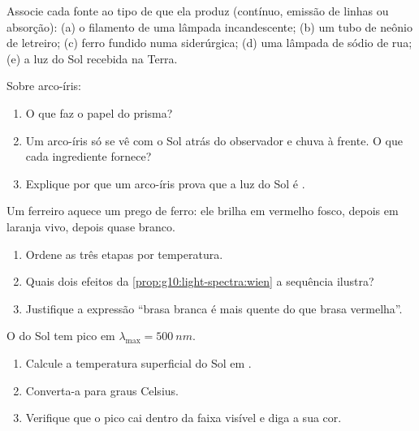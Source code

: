 \begin{exercise}[$\star$]\label{exo:g10:light-spectra:3}
Associe cada fonte ao tipo de  que ela produz (contínuo, emissão de
linhas ou absorção): (a) o filamento de uma lâmpada incandescente; (b) um
tubo de neônio de letreiro; (c) ferro fundido numa siderúrgica; (d) uma
lâmpada de sódio de rua; (e) a luz do Sol recebida na Terra.
\end{exercise}

\begin{exercise}[$\star$]\label{exo:g10:light-spectra:4}
Sobre arco-íris:
\begin{enumerate}
  \item O que faz o papel do prisma?
  \item Um arco-íris só se vê com o Sol atrás do observador e chuva à
        frente. O que cada ingrediente fornece?
  \item Explique por que um arco-íris prova que a luz do Sol é .
\end{enumerate}
\end{exercise}

\begin{exercise}[$\star$]\label{exo:g10:light-spectra:5}
Um ferreiro aquece um prego de ferro: ele brilha em vermelho fosco, depois
em laranja vivo, depois quase branco.
\begin{enumerate}
  \item Ordene as três etapas por temperatura.
  \item Quais dois efeitos da \cref{prop:g10:light-spectra:wien} a sequência
        ilustra?
  \item Justifique a expressão ``brasa branca é mais quente do que brasa
        vermelha''.
\end{enumerate}
\end{exercise}

\begin{exercise}[$\star\star$]\label{exo:g10:light-spectra:6}
O  do Sol tem pico em $\lambda_{\max} = \qty{500}{nm}$.
\begin{enumerate}
  \item Calcule a temperatura superficial do Sol em .
  \item Converta-a para graus Celsius.
  \item Verifique que o pico cai dentro da faixa visível e diga a sua cor.
\end{enumerate}
\end{exercise}

